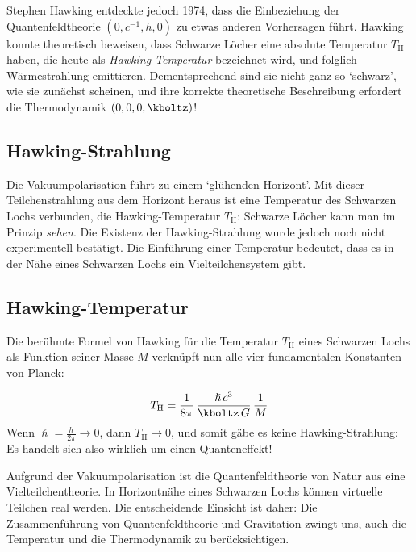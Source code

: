 \documentclass{scrartcl}
\begin{document}
Stephen Hawking entdeckte jedoch 1974, dass die Einbeziehung der Quantenfeldtheorie $(0,c^{-1},h,0)$ zu etwas anderen Vorhersagen führt. Hawking konnte theoretisch beweisen, dass Schwarze Löcher eine absolute Temperatur $T_\mathrm{H}$ haben, die heute als \emph{Hawking-Temperatur} bezeichnet wird, und folglich Wärmestrahlung emittieren. Dementsprechend sind sie nicht ganz so \enquote*{schwarz}, wie sie zunächst scheinen, und ihre korrekte theoretische Beschreibung erfordert die Thermodynamik $(0,0,0,\kboltz)$!


\subsection*{Hawking-Strahlung}

Die Vakuumpolarisation führt zu einem \enquote*{glühenden Horizont}. Mit dieser Teilchenstrahlung aus dem Horizont heraus ist eine Temperatur des Schwarzen Lochs verbunden, die Hawking-Temperatur $T_{\text{H}}$: Schwarze Löcher kann man im Prinzip \emph{sehen}. Die Existenz der Hawking-Strahlung wurde jedoch noch nicht experimentell bestätigt. Die Einführung einer Temperatur bedeutet, dass es in der Nähe eines Schwarzen Lochs ein Vielteilchensystem gibt. 


\subsection*{Hawking-Temperatur}

Die berühmte Formel von Hawking für die Temperatur $T_{\text{H}}$ eines Schwarzen Lochs als Funktion seiner Masse $M$ verknüpft nun alle vier fundamentalen Konstanten von Planck:

\begin{equation*}\label{eq:HawkingT}
  T_{\text{H}} = \frac{1}{8 \pi}\, \frac{\hslash\, c^3}{\kboltz\, G}\, \frac{1}{M}
\end{equation*}
%
Wenn $\hslash=\frac{h}{2\pi}\rightarrow0$, dann $T_\text{H}\rightarrow0$, und somit gäbe es keine Hawking-Strahlung: Es handelt sich also wirklich um einen Quanteneffekt!

Aufgrund der Vakuumpolarisation ist die Quantenfeldtheorie von Natur aus eine Vielteilchentheorie. In Horizontnähe eines Schwarzen Lochs können virtuelle Teilchen real werden. Die entscheidende Einsicht ist daher: Die Zusammenführung von Quantenfeldtheorie und Gravitation zwingt uns, auch die Temperatur und die Thermodynamik zu berücksichtigen.
\end{document}
